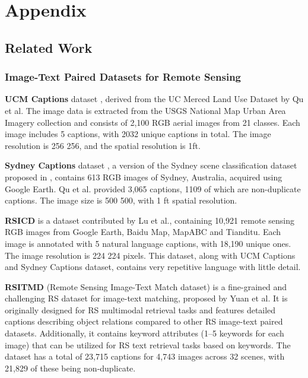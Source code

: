 \documentclass[journal]{IEEEtran}
\begin{document}






\appendix
\section{Appendix}
\subsection{Related Work}
\label{appendix:related_work}
\subsubsection{Image-Text Paired Datasets for Remote Sensing}

\textbf{UCM Captions} dataset \cite{UCMSydeney}, derived from the UC Merced Land Use Dataset \cite{ucm} by Qu et al. The image data is extracted from the USGS National Map Urban Area Imagery collection and consists of 2,100 RGB aerial images from 21 classes. Each image includes 5 captions, with 2032 unique captions in total. The image resolution is 256  256, and the spatial resolution is 1ft. 


\textbf{Sydney Captions} dataset \cite{UCMSydeney}, a version of the Sydney scene classification dataset proposed in \cite{6910306}, contains 613 RGB images of Sydney, Australia, acquired using Google Earth. Qu et al. provided 3,065 captions, 1109 of which are non-duplicate captions. The image size is 500  500, with 1 ft spatial resolution.


\textbf{RSICD} \cite{RSICD} is a dataset contributed by Lu et al., containing 10,921 remote sensing RGB images from Google Earth, Baidu Map, MapABC and Tianditu. Each image is annotated with 5 natural language captions, with 18,190 unique ones. The image resolution is 224  224 pixels. This dataset, along with UCM Captions and Sydney Captions dataset, contains very repetitive language with little detail.


\textbf{RSITMD} \cite{RSITMD} (Remote Sensing Image-Text Match dataset) is a fine-grained and challenging RS dataset for image-text matching, proposed by Yuan et al. It is originally designed for RS multimodal retrieval tasks and features detailed captions describing object relations compared to other RS image-text paired datasets. Additionally, it contains keyword attributes (1–5 keywords for each image) that can be utilized for RS text retrieval tasks based on keywords. The dataset has a total of 23,715 captions for 4,743 images across 32 scenes, with 21,829 of these being non-duplicate.
\end{document}
